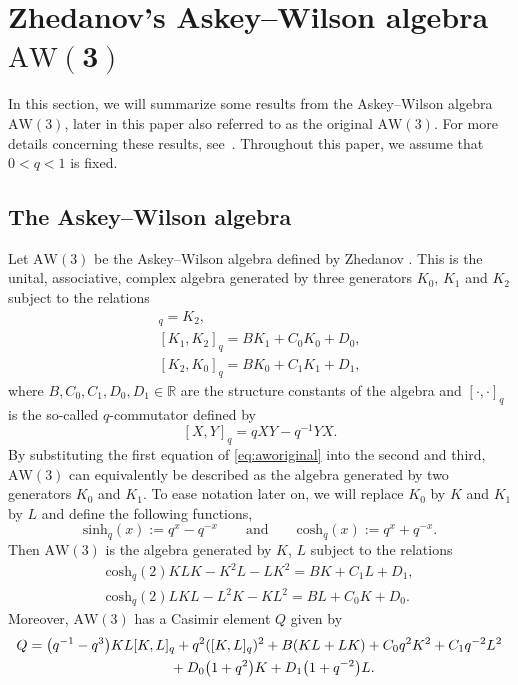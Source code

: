 \documentclass[pdftex]{sigma}
\numberwithin{equation}{section}
\newcommand{\RR}{\mathbb{R}}
\newcommand{\aw}{\mathrm{AW}\!\left(3\right)}
\newcommand{\chq}{\mathrm{cosh}_q}
\newcommand{\shq}{\mathrm{sinh}_q}
\begin{document}
\section[Zhedanov's Askey--Wilson algebra AW(3)]{Zhedanov's Askey--Wilson algebra $\boldsymbol{\aw}$}\label{sec:aw}

In this section, we will summarize some results from the Askey--Wilson algebra $\aw$, later in this paper also referred to as the original $\aw$. For more details concerning these results, see~\cite{Zhedanov1991}. Throughout this paper, we assume that $0<q<1$ is fixed.

\subsection{The Askey--Wilson algebra}
Let $\aw$ be the Askey--Wilson algebra defined by Zhedanov \cite{Zhedanov1991}. This is the unital, associative, complex algebra generated by three generators $K_0$, $K_1$ and $K_2$ subject to the relations
\begin{gather}
[K_0,K_1]_q=K_2,\nonumber\\
[K_1,K_2]_q=BK_1 + C_0K_0+D_0,\label{eq:aworiginal}\\
[K_2,K_0]_q=BK_0+C_1K_1 + D_1,\nonumber
	\end{gather}
where $B,C_0,C_1,D_0,D_1\in\RR$ are the structure constants of the algebra and $[\cdot,\cdot]_q$ is the so-called $q$-commutator defined by
\[
[X,Y]_q=q XY - q^{-1}YX.
\]
By substituting the first equation of \eqref{eq:aworiginal} into the second and third, $\aw$ can equivalently be described as the algebra generated by two generators $K_0$ and $K_1$. To ease notation later on, we will replace $K_0$ by $K$ and $K_1$ by $L$ and define the following functions,
\[
\shq(x):=q^x-q^{-x} \qquad \text{and} \qquad \chq(x):=q^x+q^{-x}.
\]
Then $\aw$ is the algebra generated by $K$, $L$ subject to the relations
\begin{gather}
	\chq(2)KLK - K^2L-LK^2= BK + C_1L + D_1,\label{eq:awrelation2}\\
	\chq(2)LKL - L^2K-KL^2= BL + C_0K + D_0 \label{eq:awrelation1}.	 		
\end{gather}
Moreover, $\aw$ has a Casimir element $Q$ given by
\begin{gather}
Q= \big(q^{-1}-q^3\big)KL[K,L]_q + q^2 ([K,L]_q )^2+B(KL+LK)+C_0q^2K^2+C_1q^{-2}L^2\nonumber\\
\hphantom{Q= }{} + D_0\big(1+q^2\big)K+D_1\big(1+q^{-2}\big)L. \label{eq:casimiraw3}
\end{gather}
\end{document}
